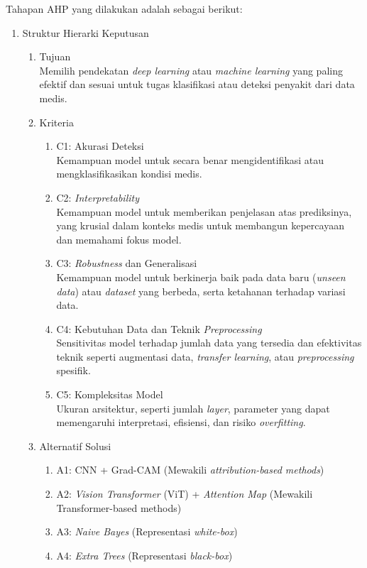 Tahapan AHP yang dilakukan adalah sebagai berikut:
\begin{enumerate}
	\item Struktur Hierarki Keputusan
	\begin{enumerate}
		\item Tujuan \\
		Memilih pendekatan \textit{deep learning} atau \textit{machine learning} yang paling efektif dan sesuai untuk tugas klasifikasi atau deteksi penyakit dari data medis.
		\item Kriteria
		\begin{enumerate}
			\item C1: Akurasi Deteksi \\
			Kemampuan model untuk secara benar mengidentifikasi atau mengklasifikasikan kondisi medis.
			\item C2: \textit{Interpretability} \\
			Kemampuan model untuk memberikan penjelasan atas prediksinya, yang krusial dalam konteks medis untuk membangun kepercayaan dan memahami fokus model.
			\item C3: \textit{Robustness} dan Generalisasi \\
			Kemampuan model untuk berkinerja baik pada data baru (\textit{unseen data}) atau \textit{dataset} yang berbeda, serta ketahanan terhadap variasi data.
			\item C4: Kebutuhan Data dan Teknik \textit{Preprocessing}\\
			Sensitivitas model terhadap jumlah data yang tersedia dan efektivitas teknik seperti augmentasi data, \textit{transfer learning}, atau \textit{preprocessing} spesifik.
			\item C5: Kompleksitas Model \\
			Ukuran arsitektur, seperti jumlah \textit{layer}, parameter yang dapat memengaruhi interpretasi, efisiensi, dan risiko \textit{overfitting}.
		\end{enumerate}
		\item Alternatif Solusi
		\begin{enumerate}
			\item A1: CNN + Grad-CAM (Mewakili \textit{attribution-based methods})
			\item A2: \textit{Vision Transformer }(ViT) + \textit{Attention Map }(Mewakili Transformer-based methods)
			\item A3: \textit{Naive Bayes} (Representasi \textit{white-box})
			\item A4: \textit{Extra Trees} (Representasi \textit{black-box})

\end{enumerate}
\end{enumerate}
\end{enumerate}

